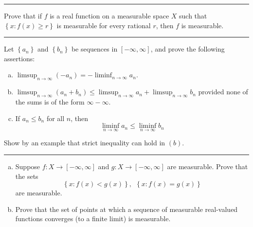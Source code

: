 \documentclass[letterpaper, 12pt]{article}
\begin{document}
\noindent\rule{7in}{2.8pt}
\begin{problem}{1.3}
Prove that if \(f\) is a real function on a measurable space \(X\) such that \(\left\{ x:f(x)\geq r \right\}\) is measurable for every rational \(r\), then \(f\) is measurable.
\end{problem}
\begin{solution}

\end{solution}

\noindent\rule{7in}{2.8pt}
\begin{problem}{1.4}
Let \(\left\{ a_n \right\}\) and \(\left\{ b_n \right\}\) be sequences in \([-\infty, \infty]\), and prove the following assertions:
\begin{enumerate}[(a)]
  \item \(\limsup_{n\to \infty}(-a_n)=-\liminf_{n\to \infty}a_n\). 
  \item \(\limsup_{n\to \infty}(a_n+b_n)\leq \limsup_{n\to \infty}a_n+\limsup_{n\to\infty}b_n\) provided none of the sums is of the form \(\infty-\infty\).
  \item If \(a_n\leq b_n\) for all \(n\), then 
  \[\liminf_{n\to \infty} a_n\leq \liminf_{n\to \infty}b_n\]
\end{enumerate}
Show by an example that strict inequality can hold in \((b)\).
\end{problem}
\begin{solution}

\end{solution}

\noindent\rule{7in}{2.8pt}
\begin{problem}{1.5}
\begin{enumerate}[(a)]
  \item Suppose \(f:X\rightarrow [-\infty,\infty]\) and \(g:X\rightarrow [-\infty,\infty]\) are measurable. Prove that the sets 
  \[\left\{ x:f(x)<g(x) \right\},\ \ \left\{ x:f(x)=g(x) \right\}\]
  are measurable.
  \item Prove that the set of points at which a sequence of measurable real-valued functions converges (to a finite limit) is measurable.
\end{enumerate}
\end{problem}
\begin{solution}

\end{solution}
\end{document}
